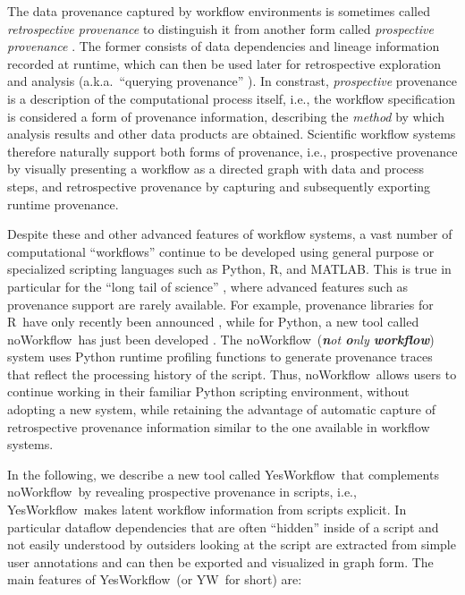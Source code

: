 \documentclass{article}
\newcommand{\NW}{\textsf{noWorkflow}}
\newcommand{\YW}{\textsf{YesWorkflow}}
\newcommand{\yw}{\textsf{YW}}
\newcommand{\R}{\textsf{R}}
\newcommand{\MATLAB}{\textsf{MATLAB}}
\begin{document}
  The data provenance captured by workflow environments is sometimes
  called \emph{retrospective provenance} to distinguish it from
  another form called \emph{prospective provenance}
  \cite{Clifford2008original,Lim2010Prospective}. The former consists
  of data dependencies and lineage information recorded at runtime,
  which can then be used later for retrospective exploration and
  analysis (a.k.a.\ ``querying provenance''
  \cite{Davidson2008Provenance}). In constrast, \emph{prospective}
  provenance is a description of the computational process itself,
  i.e., the workflow specification is considered a form of provenance
  information, describing the \emph{method} by which analysis results
  and other data products are obtained. Scientific workflow systems
  therefore naturally support both forms of provenance, i.e.,
  prospective provenance by visually presenting a workflow as a
  directed graph with data and process steps, and retrospective
  provenance by capturing and subsequently exporting runtime
  provenance.

Despite these and other advanced features of workflow systems,
a vast number of computational ``workflows'' continue to be developed
using general purpose or specialized scripting languages such as
Python, \R, and \MATLAB. This is true in particular for the ``long
tail of science'' \cite{wallis2013if,Heidorn2008Shedding}, where
advanced features such as provenance support are rarely available.
For example, provenance libraries for \R\ have only recently been
announced \cite{Lerner2014RDataTracker}, while for Python, a new tool
called \NW\ has just been developed \cite{murta2014noWorkflow}. The
\NW\ (\emph{\textbf{n}ot \textbf{o}nly \textbf{workflow}}) system uses
Python runtime profiling functions to generate provenance traces that
reflect the processing history of the script. Thus, \NW\ allows users
to continue working in their familiar Python scripting environment,
without adopting a new system, while retaining the advantage of
automatic capture of retrospective provenance information similar to
the one available in workflow systems.

In the following, we describe a new tool called \YW\  that
complements \NW\ by revealing prospective provenance in
scripts, i.e., \YW\ makes latent workflow information from scripts explicit. In
particular dataflow dependencies that are often ``hidden'' inside of a
script and not easily understood by outsiders looking at the script
are extracted from simple user annotations and can then be exported
and visualized in graph form. The main features of \YW\ (or \yw\ for short) are:
\end{document}
